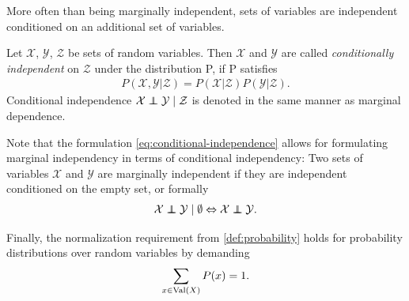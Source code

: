 More often than being marginally independent, sets of variables are independent conditioned on an
additional set of variables.
\begin{mydef}
    \label{def:probability-conditional-independence}
    Let $\mathcal{X}$, $\mathcal{Y}$, $\mathcal{Z}$ be sets of random variables. Then $\mathcal{X}$
    and $\mathcal{Y}$ are called \emph{conditionally independent} on $\mathcal{Z}$ under the
    distribution P, if P satisfies
    \begin{align}
        \label{eq:conditional-independence}
        P(\mathcal{X}, \mathcal{Y}|\mathcal{Z}) =
        P(\mathcal{X}|\mathcal{Z})P(\mathcal{Y}|\mathcal{Z}).
    \end{align}
    Conditional independence $\mathcal{X} \independent \mathcal{Y} \;|\; \mathcal{Z}$ is denoted in the
    same manner as marginal dependence.
\end{mydef}
Note that the formulation \cref{eq:conditional-independence} allows for formulating marginal
independency in terms of conditional independency: Two sets of variables $\mathcal{X}$ and
$\mathcal{Y}$ are marginally independent if they are independent conditioned on the empty set, or
formally
\begin{align}
    \label{probability-conditional-marginal}
    \mathcal{X} \independent \mathcal{Y} \; | \; \emptyset \Leftrightarrow \mathcal{X} \independent \mathcal{Y}.
\end{align}

Finally, the normalization requirement from \cref{def:probability} holds for probability
distributions over random variables by demanding
\begin{align}
    \label{eq:probability-normalization}
    \sum_{x \in \operatorname{Val}(X)}P(x) = 1.
\end{align}



